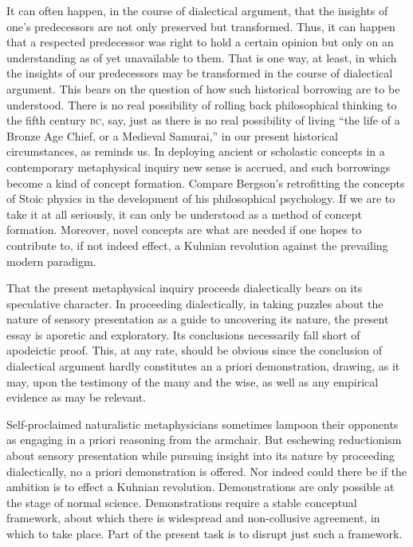 It can often happen, in the course of dialectical argument, that the insights of one's predecessors are not only preserved but transformed. Thus, it can happen that a respected predecessor was right to hold a certain opinion but only on an understanding as of yet unavailable to them. That is one way, at least, in which the insights of our predecessors may be transformed in the course of dialectical argument. This bears on the question of how such historical borrowing are to be understood. There is no real possibility of rolling back philosophical thinking to the fifth century \textsc{bc}, say, just as there is no real possibility of living ``the life of a Bronze Age Chief, or a Medieval Samurai,'' in our present historical circumstances, as \citet[140]{Williams:1981rt} reminds us. In deploying ancient or scholastic concepts in a contemporary metaphysical inquiry new sense is accrued, and such borrowings become a kind of concept formation. Compare Bergson's \citeyearpar{Bergson:1912pi} retrofitting the concepts of Stoic physics in the development of his philosophical psychology. If we are to take it at all seriously, it can only be understood as a method of concept formation. Moreover, novel concepts are what are needed if one hopes to contribute to, if not indeed effect, a Kuhnian revolution against the prevailing modern paradigm.

That the present metaphysical inquiry proceeds dialectically bears on its speculative character. In proceeding dialectically, in taking puzzles about the nature of sensory presentation as a guide to uncovering its nature, the present essay is aporetic and exploratory. Its conclusions necessarily fall short of apodeictic proof. This, at any rate, should be obvious since the conclusion of dialectical argument hardly constitutes an a priori demonstration, drawing, as it may, upon the testimony of the many and the wise, as well as any empirical evidence as may be relevant. 

Self-proclaimed naturalistic metaphysicians sometimes lampoon their opponents as engaging in a priori reasoning from the armchair. But eschewing reductionism about sensory presentation while pursuing insight into its nature by proceeding dialectically, no a priori demonstration is offered. Nor indeed could there be if the ambition is to effect a Kuhnian revolution. Demonstrations are only possible at the stage of normal science. Demonstrations require a stable conceptual framework, about which there is widespread and non-collusive agreement, in which to take place. Part of the present task is to disrupt just such a framework.

